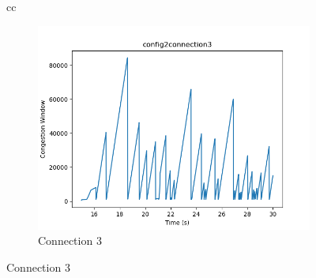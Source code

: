 \documentclass[11pt]{article}
\begin{document}
\begin{figure}[H]
\begin{tabular}[c]{cc}
      {\begin{subfigure}[c]{0.5\textwidth}
        \centering
        \includegraphics[width=\textwidth]{Q3/outputs/config2connection3.png}
        \caption{Connection 3}
      \end{subfigure}}
  \end{tabular}
\end{figure}
\end{document}
